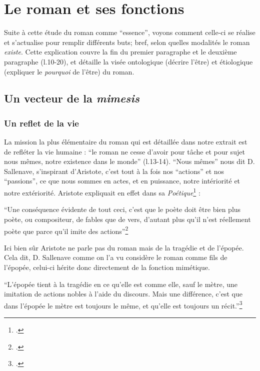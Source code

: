 \documentclass[a4paper,10pt]{article}
\begin{document}
	\section{Le roman et ses fonctions}
		Suite à cette étude du roman comme ``essence'', voyons comment celle-ci se réalise et s'actualise pour remplir différents buts; bref, selon quelles modalités le roman \textit{existe}. Cette explication couvre la fin du premier paragraphe et le deuxième paragraphe (l.10-20), et détaille la visée ontologique (décrire l'être) et étiologique (expliquer le \textit{pourquoi} de l'être) du roman.
		\subsection{Un vecteur de la \textit{mimesis}}
			\subsubsection{Un reflet de la vie}
				La mission la plus élémentaire du roman qui est détaillée dans notre extrait est de refléter la vie humaine : ``le roman ne cesse d'avoir pour tâche et pour sujet nous mêmes, notre existence dans le monde'' (l.13-14). ``Nous mêmes'' nous dit D. Sallenave, s'inspirant d'Aristote, c'est tout à la fois nos ``actions'' et nos ``passions'', ce que nous sommes en actes, et en puissance, notre intériorité et notre extériorité. Aristote expliquait en effet dans sa \textit{Poétique}\footcite{Aristote} : 
				\begin{center}
					\footnotesize
					\begin{minipage}{0.7\textwidth}
						``Une conséquence évidente de tout ceci, c'est que le poète doit être bien plus poète, ou compositeur, de fables que de vers, d'autant plus qu'il n'est réellement poète que parce qu'il imite des actions''\footcite[p.~51]{Aristote}
					\end{minipage}
				\end{center}
				Ici bien sûr Aristote ne parle pas du roman mais de la tragédie et de l'épopée. Cela dit, D. Sallenave comme on l'a vu considère le roman comme fils de l'épopée, celui-ci hérite donc directement de la fonction mimétique. 
				\begin{center}
					\footnotesize
					\begin{minipage}{0.7\textwidth}
						``L'épopée tient à la tragédie en ce qu'elle est comme elle, sauf le mètre, une imitation de actions nobles à l'aide du discours. Mais une différence, c'est que dans l'épopée le mètre est toujours le même, et qu'elle est toujours un récit.''\footcite[p.~27]{Aristote}
					\end{minipage}
				\end{center}
\end{document}
